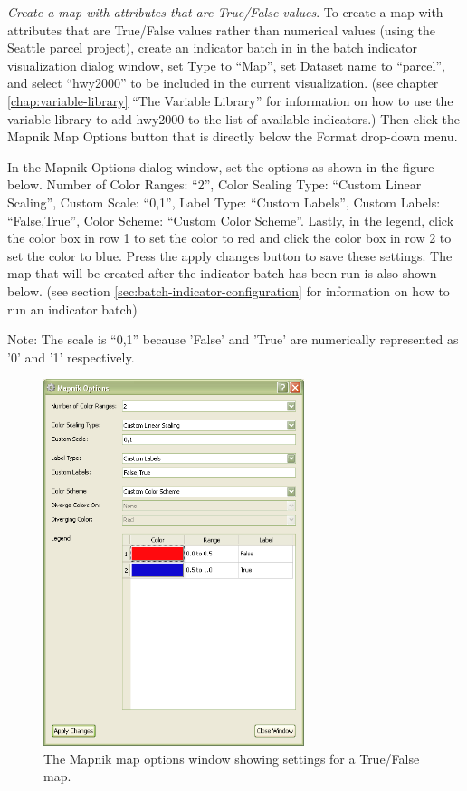 \emph{Create a map with attributes that are True/False values}.
To create a map with attributes that are True/False values rather than numerical 
values (using the Seattle parcel project), create an indicator batch in in the batch 
indicator visualization dialog window, set Type to ``Map'', set Dataset name to ``parcel'', 
and select ``hwy2000'' to be included in the current visualization. (see 
chapter \ref{chap:variable-library} ``The Variable Library'' for information on how to use 
the variable library to add hwy2000 to the list of available indicators.) Then click 
the Mapnik Map Options button that is directly below the Format drop-down menu.

In the Mapnik Options dialog window, set the options as shown in the figure below. 
Number of Color Ranges: ``2'', Color Scaling Type: ``Custom Linear Scaling'', 
Custom Scale: ``0,1'', Label Type: ``Custom Labels'', Custom Labels: ``False,True'', 
Color Scheme: ``Custom Color Scheme''. Lastly, in the legend, click the 
color box in row 1 to set the color to red and click the color box in row 2 
to set the color to blue. Press the apply changes button to save these settings. 
The map that will be created after the indicator batch has been run is also shown 
below. (see section \ref{sec:batch-indicator-configuration} 
for information on how to run an indicator batch)

Note: The scale is ``0,1'' because 'False' and 'True' are numerically 
represented as '0' and '1' respectively.

\begin{figure}[hb]
\begin{center}
\includegraphics[width=3in]{part-gui/images/result-manager-mapnik-options-example-TF.png}
\end{center}
\caption{The Mapnik map options window showing settings for a True/False map.}
\label{fig:result-manager-mapnik-options-example-TF}
\end{figure}
\clearpage

